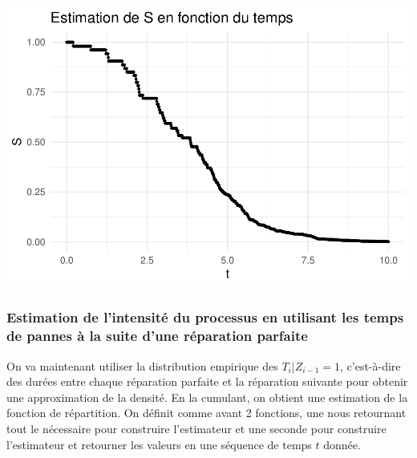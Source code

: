\documentclass[
]{article}
\begin{document}
\includegraphics{Projet-Poisson_files/figure-latex/unnamed-chunk-5-1.pdf}

\subsubsection{Estimation de l'intensité du processus en utilisant les
temps de pannes à la suite d'une réparation
parfaite}\label{estimation-de-lintensituxe9-du-processus-en-utilisant-les-temps-de-pannes-uxe0-la-suite-dune-ruxe9paration-parfaite}

On va maintenant utiliser la distribution empirique des
\(T_i | Z_{i-1} = 1\), c'est-à-dire des durées entre chaque réparation
parfaite et la réparation suivante pour obtenir une approximation de la
densité. En la cumulant, on obtient une estimation de la fonction de
répartition. On définit comme avant 2 fonctions, une nous retournant
tout le nécessaire pour construire l'estimateur et une seconde pour
construire l'estimateur et retourner les valeurs en une séquence de
temps \(t\) donnée.
\end{document}
